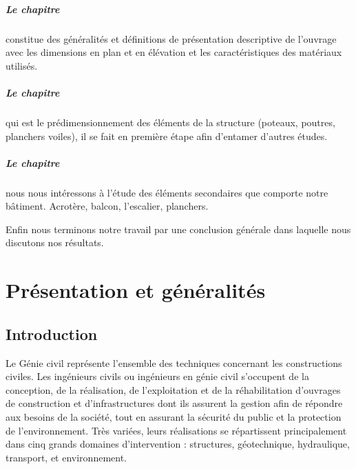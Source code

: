 \documentclass[12pt,a4paper]{report}
\newcommand{\RomanNum}[1] %
{\MakeUppercase{\romannumeral #1}}
\numberwithin{equation}{section}
\begin{document}
	\paragraph{Le chapitre \RomanNum{1}} constitue des généralités et définitions de présentation descriptive de l’ouvrage avec les dimensions en plan et en élévation et les caractéristiques des matériaux utilisés.

	
	\paragraph{Le chapitre \RomanNum{2}} qui est le prédimensionnement des éléments de la structure (poteaux, poutres,
	planchers voiles), il se fait en première étape afin d'entamer d'autres études.
	
	
	\paragraph{Le chapitre \RomanNum{3}} nous nous intéressons à l’étude des éléments secondaires que comporte notre bâtiment. Acrotère, balcon, l’escalier, planchers.
	
	\vspace{0.4cm}
	
	Enfin nous terminons notre travail par une conclusion générale dans laquelle nous
	discutons nos résultats.
	
	
	
	
	
	
	
	
	
	\setcounter{page}{1}
	
	
	\chapter{Présentation et généralités}
	
	
	
	
	
	\section{Introduction}
	
	
	Le Génie civil représente l'ensemble des techniques concernant les constructions civiles. Les ingénieurs civils ou ingénieurs en génie civil s’occupent de la conception, de la réalisation, de l’exploitation et de la réhabilitation d’ouvrages de construction et d’infrastructures dont ils
	assurent la gestion afin de répondre aux besoins de la société, tout en assurant la sécurité du public et la protection de l’environnement. Très variées, leurs réalisations se répartissent principalement dans cinq grands domaines d’intervention : structures, géotechnique, hydraulique, transport, et environnement.
	
\end{document}
